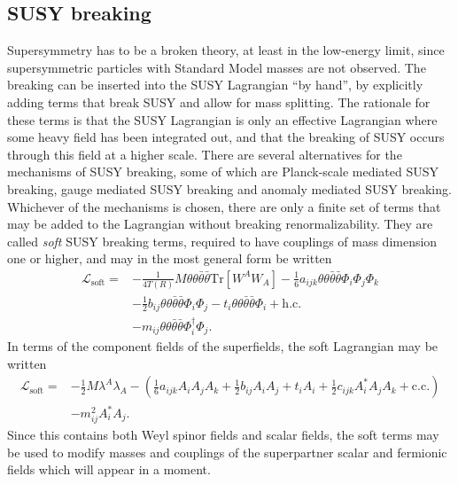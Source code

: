 \subsection{SUSY breaking}
Supersymmetry has to be a broken theory, at least in the low-energy limit, since supersymmetric particles with Standard Model masses are not observed. The breaking can be inserted into the SUSY Lagrangian ``by hand'', by explicitly adding terms that break SUSY and allow for mass splitting. The rationale for these terms is that the SUSY Lagrangian is only an effective Lagrangian where some heavy field has been integrated out, and that the breaking of SUSY occurs through this field at a higher scale. There are several alternatives for the mechanisms of SUSY breaking, some of which are Planck-scale mediated SUSY breaking, gauge mediated SUSY breaking and anomaly mediated SUSY breaking. Whichever of the mechanisms is chosen, there are only a finite set of terms that may be added to the Lagrangian without breaking renormalizability. They are called {\it soft} SUSY breaking terms, required to have couplings of mass dimension one or higher, and may in the most general form be written
\begin{align}
	\mathcal{L}_\mathrm{soft} = &-\frac{1}{4T(R)}M\theta\theta\bar\theta\bar\theta \mathrm{Tr} [W^A W_A] - \frac{1}{6}a_{ijk} \theta\theta\bar\theta\bar\theta\Phi_i \Phi_j \Phi_k\nonumber\\
	&-\frac{1}{2}b_{ij} \theta\theta\bar\theta\bar\theta\Phi_i \Phi_j - t_i \theta\theta\bar\theta\bar\theta \Phi_i + \mathrm{h.c.}\\
	&-m_{ij} \theta\theta\bar\theta\bar\theta \Phi_i^\dag \Phi_j.\nonumber
\end{align}
In terms of the component fields of the superfields, the soft Lagrangian may be written
\begin{align}
	\mathcal{L}_\mathrm{soft} = &-\frac{1}{2} M\lambda^A\lambda_A - \left( \frac{1}{6} a_{ijk} A_i A_j A_k + \frac{1}{2} b_{ij} A_i A_j + t_i A_i + \frac{1}{2} c_{ijk} A^*_i A_j A_k + \mathrm{c.c.}\right)\\
	&- m_{ij}^2 A_i^* A_j.\nonumber
\end{align}
Since this contains both Weyl spinor fields and scalar fields, the soft terms may be used to modify masses and couplings of the superpartner scalar and fermionic fields which will appear in a moment.



